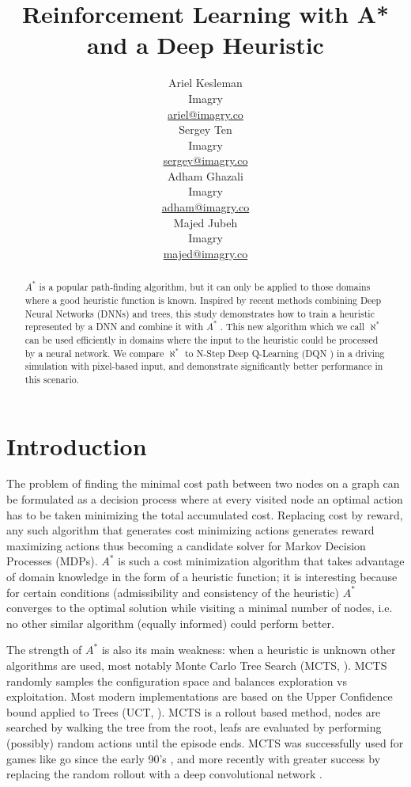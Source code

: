 \documentclass{article}
\title{Reinforcement Learning with A* and a Deep Heuristic}
\author{
  Ariel Kesleman\\
  Imagry\\
  \href{mailto:ariel@imagry.co}{ariel@imagry.co}\\
  \And
  Sergey Ten\\
  Imagry\\
  \href{mailto:}{sergey@imagry.co}\\
  \And
  Adham Ghazali\\
  Imagry\\
  \href{mailto:adham@imagry.co}{adham@imagry.co}\\
  \And
  Majed Jubeh\\
  Imagry\\
  \href{mailto:majed@imagry.co}{majed@imagry.co}\\
}
\newcommand{\alephstar}{$\aleph^*$ }
\newcommand{\astar}{$A^*$ }
\begin{document}
\maketitle


\begin{abstract}
\astar is a popular path-finding algorithm, but it can only be  applied to those domains where a good heuristic function is known. Inspired by recent methods combining Deep Neural Networks (DNNs) and trees, this study demonstrates how to train a heuristic represented by a DNN and combine it with \astar. This new algorithm which we call \alephstar can be used efficiently in domains where the input to the heuristic could be processed by a neural network. We compare \alephstar to N-Step Deep Q-Learning (DQN \citealt{mnih2013playing}) in a driving simulation with pixel-based input, and demonstrate significantly better performance in this scenario.
\end{abstract} 



\section{Introduction}
\label{sec:introduction}

The problem of finding the minimal cost path between two nodes on a graph can be formulated as a decision process where at every visited node an optimal action has to be taken minimizing the total accumulated cost. Replacing cost by reward, any such algorithm that generates cost minimizing actions generates reward maximizing actions thus becoming a candidate solver for Markov Decision Processes (MDPs). \astar \citep{hart68} is such a cost minimization algorithm that takes advantage of domain knowledge in the form of a heuristic function; it is interesting because for certain conditions (admissibility and consistency of the heuristic) \astar converges to the optimal solution while visiting a minimal number of nodes, i.e. no other similar algorithm (equally informed) could perform better. 

The strength of \astar is also its main weakness: when a heuristic is unknown other algorithms are used, most notably Monte Carlo Tree Search (MCTS, \citealt{abramson1987}). MCTS randomly samples the configuration space and balances exploration vs exploitation. Most modern implementations are based on the Upper Confidence bound applied to Trees (UCT, \citealt{kocsis2006}). MCTS is a rollout based method, nodes are searched by walking the tree from the root, leafs are evaluated by performing (possibly) random actions until the episode ends. MCTS was successfully used for games like go since the early 90's \citep{brugmann1993, gelly2006}, and more recently with greater success by replacing the random rollout with a deep convolutional network \citep{silver2016, anthony2017, silver2017, silver2017mastering}.
\end{document}
